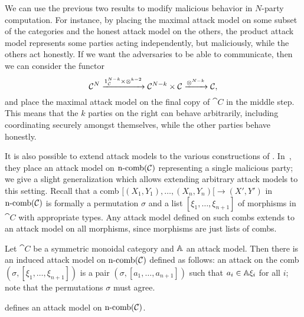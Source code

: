 We can use the previous two results to modify malicious behavior in $N$-party
computation. For instance, by placing the maximal attack model on some subset of
the categories and the honest attack model on the others, the product attack
model represents some parties acting independently, but maliciously, while the
others act honestly. If we want the adversaries to be able to communicate, then
we can consider the functor \[
  \cat{C}^N\xto{1_\cat{C}^{N-k}\times\otimes^{k-2}}\cat{C}^{N-k}\times\cat{C}\xto{\otimes^{N-k}}\cat{C},
\]and place the maximal attack model on the final copy of $\cat{C}$ in the
middle step. This means that the $k$ parties on the right can behave
arbitrarily, including coordinating securely amongst themselves, while the other
parties behave honestly.

It is also possible to extend attack models to the various constructions of
.
In~\cite{broadbent-karvonen-2022}, they place an attack model on
$\ncomb{\cat{C}}$ representing a single malicious party; we give a slight
generalization which allows extending arbitrary attack models to this setting.
Recall that a comb $[(X_1, Y_1), \dots, (X_n, Y_n)[\to (X', Y')$ in
$\ncomb{\cat{C}}$ is formally a permutation $\sigma$ and a list $[\xi_1, \dots,
\xi_{n+1}]$ of morphisms in $\cat{C}$ with appropriate types. Any attack model
defined on such combs extends to an attack model on all morphisms, since
morphisms are just lists of combs.

\begin{dfn}\label{def:n-comb-attack}
  Let $\cat{C}$ be a symmetric monoidal category and $\AA$ an attack model. Then
  there is an induced attack model on $\ncomb{\cat{C}}$ defined as follows: an
  attack on the comb $(\sigma, [\xi_1, \dots, \xi_{n+1}])$ is a pair
  $(\sigma, [a_1, \dots, a_{n+1}])$ such that $a_i\in\AA \xi_i$ for all
  $i$; note that the permutations $\sigma$ must agree.
\end{dfn}

\begin{prop}
   defines an attack model on
  $\ncomb{\cat{C}}$.
\end{prop}

